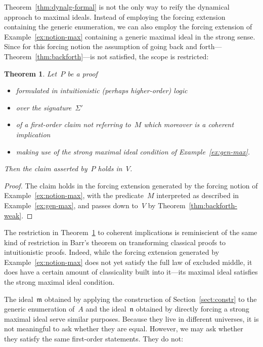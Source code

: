 \documentclass[com,11pt,crcready]{iosart2x}
\theoremstyle{definition}
\theoremstyle{plain}
\newtheorem{theorem}[definition]{Theorem}
\theoremstyle{remark}
\newcommand{\?}{\,{:}\,}
\newcommand{\mmm}{\mathfrak{m}}
\newcommand{\nnn}{\mathfrak{n}}
\renewcommand{\_}{\mathpunct{.}\,}
\begin{document}
Theorem~\ref{thm:dynalg-formal} is not the only way to reify the dynamical
approach to maximal ideals. Instead of employing the forcing extension
containing the generic enumeration, we can also employ the forcing extension
of Example~\ref{ex:notion-max} containing a generic maximal ideal in the strong
sense. Since for this forcing notion the assumption of going back and
forth---Theorem~\ref{thm:backforth}---is not satisfied, the scope is
restricted:

\begin{theorem}\label{thm:dynalg-formal-strong}Let~$P$ be a proof
\begin{itemize}
\item formulated in intuitionistic (perhaps higher-order) logic
\item over the signature~$\Sigma'$
\item of a first-order claim not referring to~$M$ which moreover is a coherent implication
\item making use of the strong maximal ideal condition of
Example~\ref{ex:gen-max}.
\end{itemize}
Then the claim asserted by~$P$ holds in~$V$.
\end{theorem}

\begin{proof}The claim holds in the forcing extension generated by the forcing
notion of Example~\ref{ex:notion-max}, with the predicate~$M$ interpreted as
described in Example~\ref{ex:gen-max}, and passes down to~$V$ by
Theorem~\ref{thm:backforth-weak}.\end{proof}


The restriction in Theorem~\ref{thm:dynalg-formal-strong} to coherent
implications is reminiscient of the same kind of restriction in Barr's theorem on
transforming classical proofs to intuitionistic proofs. Indeed, while the
forcing extension generated by Example~\ref{ex:notion-max} does not yet satisfy
the full law of excluded middle, it does have a certain amount of classicality
built into it---its maximal ideal satisfies the strong maximal ideal condition.

The ideal~$\mmm$ obtained by applying the construction of Section~\ref{sect:constr} to
the generic enumeration of~$A$ and the ideal~$\nnn$ obtained by directly forcing a
strong maximal ideal serve similar purposes. Because they live in different universes,
it is not meaningful to ask whether they are equal. However, we may ask whether
they satisfy the same first-order statements. They do not:
\end{document}
